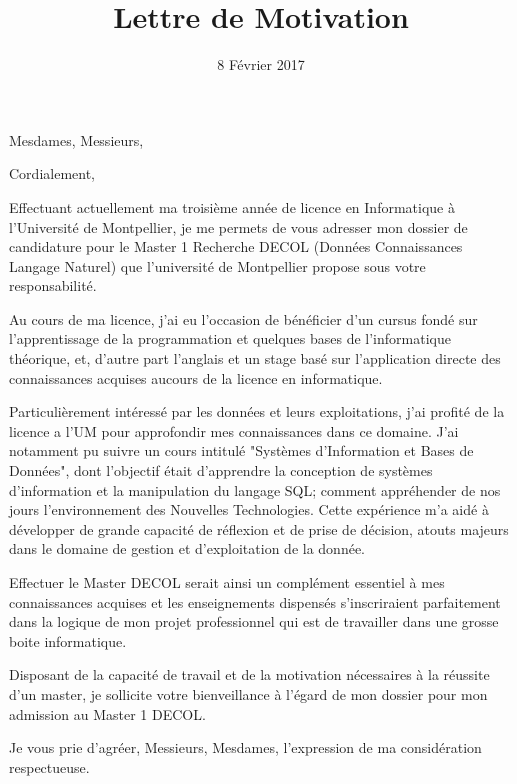 \documentclass[11pt,a4paper,sans]{moderncv}        %
\title{Lettre de Motivation}                               %
\begin{document}
\date{8 Février 2017}
\opening{Mesdames, Messieurs,}
\closing{Cordialement,}
\makelettertitle

Effectuant actuellement ma troisième année de licence en Informatique à l’Université de Montpellier, je me permets de vous adresser mon dossier de candidature pour le Master 1 Recherche DECOL (Données Connaissances Langage Naturel) que l’université de Montpellier propose sous votre responsabilité.

Au cours de ma licence, j’ai eu l’occasion de bénéficier d’un cursus fondé sur l'apprentissage de la programmation et quelques bases de l'informatique théorique, et, d’autre part l'anglais et un stage basé sur l'application directe des connaissances acquises aucours de la licence en informatique. 

Particulièrement intéressé par les données et leurs exploitations, j’ai profité de la licence a l'UM pour approfondir mes connaissances dans ce domaine. J’ai notamment pu suivre un cours intitulé "Systèmes d'Information et Bases de Données", dont l’objectif était d’apprendre la conception de systèmes d'information et la manipulation du langage SQL; comment appréhender de nos jours l'environnement des Nouvelles Technologies. Cette expérience m’a aidé à développer de grande capacité de réflexion et de prise de décision, atouts majeurs dans le domaine de gestion et d'exploitation de la donnée.

Effectuer le Master DECOL serait ainsi un complément essentiel à mes connaissances acquises et les enseignements dispensés s’inscriraient parfaitement dans la logique de mon projet professionnel qui est de travailler dans une grosse boite informatique.

Disposant de la capacité de travail et de la motivation nécessaires à la réussite d’un master, je sollicite votre bienveillance à l’égard de mon dossier pour mon admission au Master 1 DECOL.

Je vous prie d’agréer, Messieurs, Mesdames, l’expression de ma considération respectueuse.



\makeletterclosing
\end{document}
